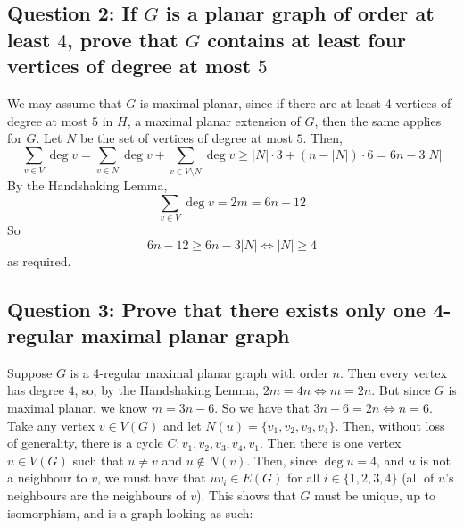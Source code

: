 \documentclass[letterpaper, 11pt]{article}
\newcommand{\1}{\mathds{1}}	%
\theoremstyle{definition}
\begin{document}
\subsection*{Question 2: If $G$ is a planar graph of order at least $4$, prove that $G$ contains at least four vertices of degree at most $5$}

We may assume that $G$ is maximal planar, since if there are at least 4 vertices of degree at most $5$ in $H$, a maximal planar extension of $G$, then the same applies for $G$. Let $N$ be the set of vertices of degree at most $5$. Then, \[
\sum \limits _{v \in V} \deg v = \sum \limits _{v \in N} \deg v + \sum \limits _{v\in V \setminus N} \deg v \ge |N| \cdot 3 + (n - |N|) \cdot 6 = 6n - 3|N|
\]
By the Handshaking Lemma, \[
\sum \limits _{v \in V} \deg v = 2m = 6n - 12
\]
So \[
6n - 12 \ge 6n - 3|N| \iff |N| \ge 4
\]
as required.

\subsection*{Question 3: Prove that there exists only one 4-regular maximal planar graph}
Suppose $G$ is a 4-regular maximal planar graph with order $n$. Then every vertex has degree $4$, so, by the Handshaking Lemma, $2m = 4n \iff m = 2n$. But since $G$ is maximal planar, we know $m = 3n - 6$. So we have that $3n - 6 = 2n \iff n = 6$. Take any vertex $v \in V(G)$ and let $N(u) = \{v_1,v_2,v_3,v_4\}$. Then, without loss of generality, there is a cycle $C: v_1,v_2,v_3,v_4,v_1$. Then there is one vertex $u \in V(G)$ such that $u \ne v$ and $u \notin N(v)$. Then, since $\deg u = 4$, and $u$ is not a neighbour to $v$, we must have that $uv_i \in E(G)$ for all $i \in \{1,2,3,4\}$ (all of $u$'s neighbours are the neighbours of $v$). This shows that $G$ must be unique, up to isomorphism, and is a graph looking as such:

\begin{figure}[h]
\centering
{}
\end{figure}
\end{document}
